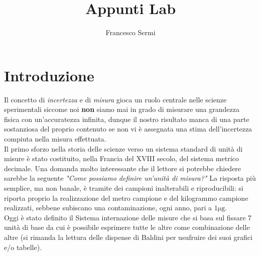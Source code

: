 \documentclass{report}
\title{Appunti Lab}
\author{Francesco Sermi}
\date{}
\begin{document}
	\maketitle
	\tableofcontents
	\newpage
	\chapter{Introduzione}
	Il concetto di \emph{incertezza} e di \emph{misura} gioca un ruolo centrale nelle scienze sperimentali siccome noi \textbf{non} siamo mai in grado di misurare una grandezza fisica con un'accuratezza infinita, dunque il nostro risultato manca di una parte sostanziosa del proprio contenuto se non vi è assegnata una stima dell'incertezza compiuta nella misura effettuata. \\
	Il primo sforzo nella storia delle scienze verso un sistema standard di unità di misure è stato costituito, nella Francia del XVIII secolo, del sistema metrico decimale. Una domanda molto interessante che il lettore si potrebbe chiedere sarebbe la seguente \emph{"Come possiamo definire un'unità di misura?"} La risposta più semplice, ma non banale, è tramite dei campioni inalterabili e riproducibili: si riporta proprio la realizzazione del metro campione e del kilogrammo campione realizzati, sebbene subiscano una contaminazione, ogni anno, pari a $1 \si{\micro\gram}$. \\
	Oggi è stato definito il Sistema internazione delle misure che si basa sul fissare 7 unità di base da cui è possibile esprimere tutte le altre come combinazione delle altre (si rimanda la lettura delle dispense di Baldini per usufruire dei suoi grafici e/o tabelle). \\
\end{document}
